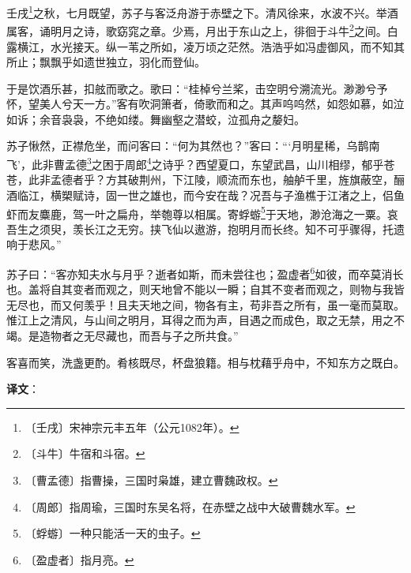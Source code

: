 \documentclass[12pt,UTF-8,openany]{ctexbook}
\begin{document}
\begin{normalsize}
    
    壬戌\footnote{〔壬戌〕宋神宗元丰五年（公元1082年）。}之秋，七月既望，苏子与客泛舟游于赤壁之下。清风徐来，水波不兴。举酒属客，诵明月之诗，歌窈窕之章。少焉，月出于东山之上，徘徊于斗牛\footnote{〔斗牛〕牛宿和斗宿。}之间。白露横江，水光接天。纵一苇之所如，凌万顷之茫然。浩浩乎如冯虚御风，而不知其所止；飘飘乎如遗世独立，羽化而登仙。
    
    于是饮酒乐甚，扣舷而歌之。歌曰：“桂棹兮兰桨，击空明兮溯流光。渺渺兮予怀，望美人兮天一方。”客有吹洞箫者，倚歌而和之。其声呜呜然，如怨如慕，如泣如诉；余音袅袅，不绝如缕。舞幽壑之潜蛟，泣孤舟之嫠妇。
    
    苏子愀然，正襟危坐，而问客曰：“何为其然也？”客曰：“‘月明星稀，乌鹊南飞’，此非曹孟德\footnote{〔曹孟德〕指曹操，三国时枭雄，建立曹魏政权。}之困于周郎\footnote{〔周郎〕指周瑜，三国时东吴名将，在赤壁之战中大破曹魏水军。}之诗乎？西望夏口，东望武昌，山川相缪，郁乎苍苍，此非孟德者乎？方其破荆州，下江陵，顺流而东也，舳舻千里，旌旗蔽空，酾酒临江，横槊赋诗，固一世之雄也，而今安在哉？况吾与子渔樵于江渚之上，侣鱼虾而友麋鹿，驾一叶之扁舟，举匏尊以相属。寄蜉蝣\footnote{〔蜉蝣〕一种只能活一天的虫子。}于天地，渺沧海之一粟。哀吾生之须臾，羡长江之无穷。挟飞仙以遨游，抱明月而长终。知不可乎骤得，托遗响于悲风。”
    
    苏子曰：“客亦知夫水与月乎？逝者如斯，而未尝往也；盈虚者\footnote{〔盈虚者〕指月亮。}如彼，而卒莫消长也。盖将自其变者而观之，则天地曾不能以一瞬；自其不变者而观之，则物与我皆无尽也，而又何羡乎！且夫天地之间，物各有主，苟非吾之所有，虽一毫而莫取。惟江上之清风，与山间之明月，耳得之而为声，目遇之而成色，取之无禁，用之不竭。是造物者之无尽藏也，而吾与子之所共食。”
    
    客喜而笑，洗盏更酌。肴核既尽，杯盘狼籍。相与枕藉乎舟中，不知东方之既白。
\end{normalsize}


\newpage

\textbf{译文}：

\vspace{1em}
\end{document}
